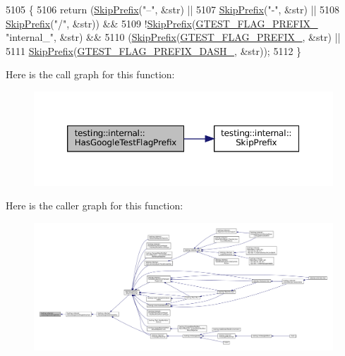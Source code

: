 \begin{DoxyCode}
5105                                                      \{
5106   \textcolor{keywordflow}{return} (\hyperlink{namespacetesting_1_1internal_a244d9a3765727306b597b8992ab84036}{SkipPrefix}(\textcolor{stringliteral}{"--"}, &str) ||
5107           \hyperlink{namespacetesting_1_1internal_a244d9a3765727306b597b8992ab84036}{SkipPrefix}(\textcolor{stringliteral}{"-"}, &str) ||
5108           \hyperlink{namespacetesting_1_1internal_a244d9a3765727306b597b8992ab84036}{SkipPrefix}(\textcolor{stringliteral}{"/"}, &str)) &&
5109          !\hyperlink{namespacetesting_1_1internal_a244d9a3765727306b597b8992ab84036}{SkipPrefix}(\hyperlink{gtest-port_8h_a088e84784c589ba9b1fc48602ad8eabf}{GTEST\_FLAG\_PREFIX\_} \textcolor{stringliteral}{"internal\_"}, &str) &&
5110          (\hyperlink{namespacetesting_1_1internal_a244d9a3765727306b597b8992ab84036}{SkipPrefix}(\hyperlink{gtest-port_8h_a088e84784c589ba9b1fc48602ad8eabf}{GTEST\_FLAG\_PREFIX\_}, &str) ||
5111           \hyperlink{namespacetesting_1_1internal_a244d9a3765727306b597b8992ab84036}{SkipPrefix}(\hyperlink{gtest-port_8h_a4251ff898f9f94ec6b8b9402c3436759}{GTEST\_FLAG\_PREFIX\_DASH\_}, &str));
5112 \}
\end{DoxyCode}
Here is the call graph for this function\+:
\nopagebreak
\begin{figure}[H]
\begin{center}
\leavevmode
\includegraphics[width=350pt]{namespacetesting_1_1internal_a6fff795269f50673e358438721710d6f_cgraph}
\end{center}
\end{figure}
Here is the caller graph for this function\+:
\nopagebreak
\begin{figure}[H]
\begin{center}
\leavevmode
\includegraphics[width=350pt]{namespacetesting_1_1internal_a6fff795269f50673e358438721710d6f_icgraph}
\end{center}
\end{figure}
\mbox{\label{namespacetesting_1_1internal_a14ff02e6d151f45e998657674e9af88a}} 
